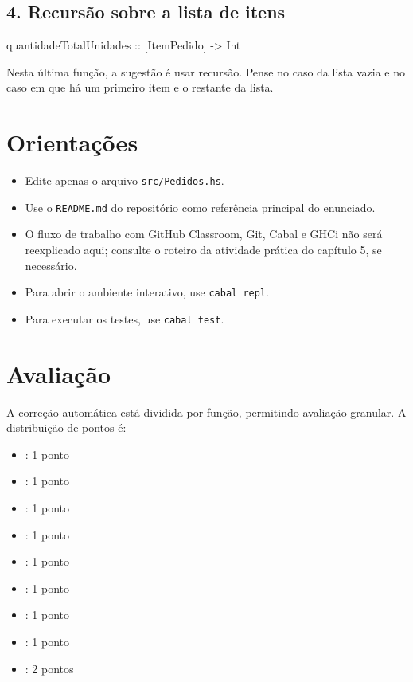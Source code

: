 \documentclass{article}
\begin{document}
\subsection*{4. Recursão sobre a lista de itens}

\begin{haskellcode}
quantidadeTotalUnidades :: [ItemPedido] -> Int
\end{haskellcode}

Nesta última função, a sugestão é usar recursão. Pense no caso da lista vazia
e no caso em que há um primeiro item e o restante da lista.

\section{Orientações}

\begin{itemize}
  \item Edite apenas o arquivo \texttt{src/Pedidos.hs}.
  \item Use o \texttt{README.md} do repositório como referência principal do
  enunciado.
  \item O fluxo de trabalho com GitHub Classroom, Git, Cabal e GHCi não será
  reexplicado aqui; consulte o roteiro da atividade prática do capítulo 5, se
  necessário.
  \item Para abrir o ambiente interativo, use \texttt{cabal repl}.
  \item Para executar os testes, use \texttt{cabal test}.
\end{itemize}

\section{Avaliação}

A correção automática está dividida por função, permitindo avaliação
granular. A distribuição de pontos é:

\begin{itemize}
  \item {}: 1 ponto
  \item {}: 1 ponto
  \item {}: 1 ponto
  \item {}: 1 ponto
  \item {}: 1 ponto
  \item {}: 1 ponto
  \item {}: 1 ponto
  \item {}: 1 ponto
  \item {}: 2 pontos
\end{itemize}
\end{document}
